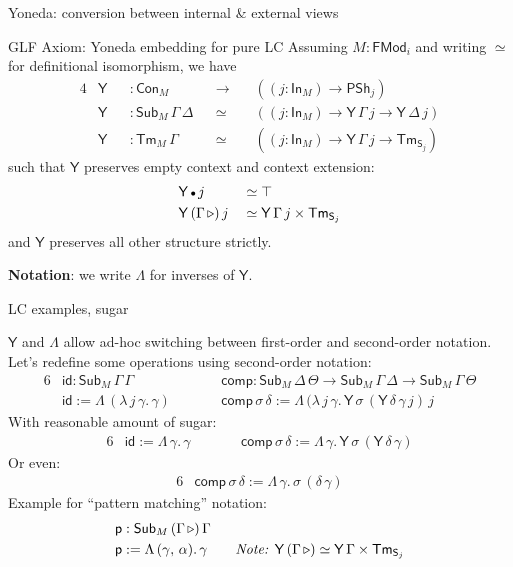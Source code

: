 \documentclass[dvipsnames,aspectratio=169]{beamer}
\newcommand{\ms}[1]{\mathsf{#1}}
\newcommand{\Con}{\mathsf{Con}}
\newcommand{\Sub}{\mathsf{Sub}}
\newcommand{\Tm}{\mathsf{Tm}}
\newcommand{\Y}{\mathsf{Y}}
\newcommand{\In}{\mathsf{In}}
\newcommand{\PSh}{\mathsf{PSh}}
\newcommand{\FMod}{\mathsf{FMod}}
\newcommand{\ext}{\triangleright}
\newcommand{\emptycon}{\scaleobj{.75}\bullet}
\renewcommand{\S}{\mathsf{S}}
\begin{document}
\begin{frame}{Yoneda: conversion between internal \& external views}

\begin{block}{GLF Axiom: Yoneda embedding for pure LC}
Assuming $M : \FMod_i$ and writing $\simeq$ for definitional isomorphism, we have
\begin{alignat*}{4}
  & \Y && : \Con_M                 &&\to\,  &&((j : \In_M) \to \PSh_j) \\
  & \Y && : \Sub_M\,\Gamma\,\Delta &&\simeq &&((j : \In_M) \to \Y\,\Gamma\,j \to \Y\,\Delta\,j)\\
  & \Y && : \Tm_M\,\Gamma          &&\simeq &&((j : \In_M) \to \Y\,\Gamma\,j \to \Tm_{\S_j})
\end{alignat*}
such that $\Y$ preserves empty context and context extension:
\begin{alignat*}{4}
  & \Y\,\emptycon\,j &&\simeq \top \\
  & \Y\,(\Gamma\,\ext)\,j &&\simeq \Y\,\Gamma\,j \times \Tm_{\S_j}
\end{alignat*}
and $\Y$ preserves all other structure strictly.
\end{block}
\textbf{Notation}: we write $\Lambda$ for inverses of $\Y$.
\end{frame}

\begin{frame}{LC examples, sugar}

$\Y$ and $\Lambda$ allow ad-hoc switching between first-order and second-order notation.
Let's redefine some operations using second-order notation:
\begin{alignat*}{6}
  & \ms{id} : \Sub_M\,\Gamma\,\Gamma && \ms{comp} : \Sub_M\,\Delta\,\Theta \to \Sub_M\,\Gamma\,\Delta \to \Sub_M\,\Gamma\,\Theta\\
  & \ms{id} := \Lambda\,(\lambda\,j\,\gamma.\,\gamma)\quad\quad && \ms{comp}\,\sigma\,\delta := \Lambda\,(\lambda\,j\,\gamma.\,\Y\,\sigma\,(\Y\,\delta\,\gamma\,j)\,j
\end{alignat*}
\pause
With reasonable amount of sugar:
\begin{alignat*}{6}
  & \ms{id} := \Lambda\,\gamma.\,\gamma\quad\quad && \ms{comp}\,\sigma\,\delta := \Lambda\,\gamma.\,\Y\,\sigma\,(\Y\,\delta\,\gamma)
\end{alignat*}
\pause
Or even:
\begin{alignat*}{6}
  &\ms{comp}\,\sigma\,\delta := \Lambda\,\gamma.\,\sigma\,(\delta\,\gamma)
\end{alignat*}
\pause
Example for ``pattern matching'' notation:
\begin{alignat*}{3}
  & \ms{p} : \Sub_M\,(\Gamma\,\ext)\,\Gamma \\
  & \ms{p} := \Lambda\,(\gamma,\,\alpha).\,\gamma \quad\quad \text{\emph{Note: $\Y\,(\Gamma\,\ext) \simeq \Y\,\Gamma \times \Tm_{\S_j}$}}
\end{alignat*}

\end{frame}
\end{document}
